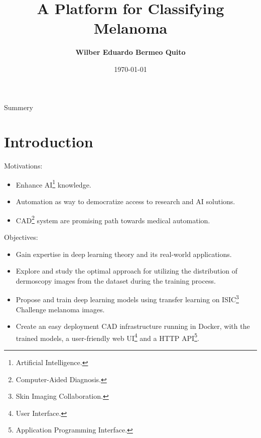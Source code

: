 \documentclass[dvipsnames,mathserif]{beamer}
\begin{document}
  \rightskip\rightmargin
  \title{A Platform for Classifying Melanoma}
  \author{ \Large \textbf{Wilber Eduardo Bermeo Quito} }
  \footnotesize{\date{\today }


    \begin{frame}
      \maketitle
    \end{frame}

    \begin{frame}{Summery}
      \footnotesize \tableofcontents
    \end{frame}

    \section{Introduction}

    \begin{frame}
      \large Motivations:
      \vspace{0.25cm}

      \footnotesize
      \begin{itemize}
        \item Enhance AI\footnote{Artificial Intelligence.} knowledge.
        \item Automation as way to democratize access to research and AI solutions.
        \item CAD\footnote{Computer-Aided Diagnosis.} system are promising path
          towards medical automation.
      \end{itemize}
    \end{frame}


    \begin{frame}
      \large Objectives:
      \vspace{0.25cm}

      \footnotesize
      \begin{itemize}
        \item Gain expertise in deep learning theory and its real-world
          applications.
        \item Explore and study the optimal approach for utilizing the distribution
          of dermoscopy images from the dataset during the training process.
        \item Propose and train deep learning models using transfer learning on ISIC\footnote{Skin Imaging Collaboration.}
          Challenge melanoma images.
        \item Create an easy deployment CAD infrastructure running in Docker,
          with the trained models, a user-friendly web UI\footnote{User
          Interface.} and a HTTP API\footnote{Application Programming Interface.}.
      \end{itemize}



\end{frame}}
\end{document}
